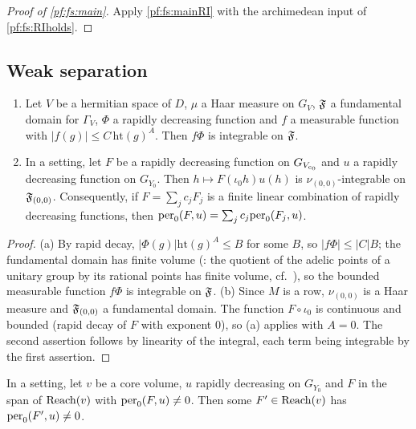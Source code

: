 \begin{proof}[Proof of \cref{pf:fs:main}]
Apply \cref{pf:fs:mainRI} with the archimedean input of \cref{pf:fs:RIholds}.
\end{proof}

\subsection{Weak separation}\label{sec:pf:fs:weak}

\begin{lemma}\label{pf:fs:perint}
\begin{enumerate}[label=(\alph*)]
\item Let $V$ be a hermitian space of $D$, $\mu$ a Haar measure on $G_V$, $\mathfrak F$ a fundamental domain for $\Gamma_V$, $\Phi$ a
rapidly decreasing function and $f$ a measurable function with $|f(g)|\le C\,\mathrm{ht}(g)^A$. Then $f\Phi$ is integrable on $\mathfrak F$.
\item In a setting, let $F$ be a rapidly decreasing function on $G_{V_{\mathrm{c}_0}}$ and $u$ a rapidly decreasing function on $G_{Y_0}$.
Then $h\mapsto F(\iota_0h)u(h)$ is $\nu_{(0,0)}$-integrable on $\mathfrak F_{(0,0)}$. Consequently, if $F=\sum_jc_jF_j$ is a finite linear
combination of rapidly decreasing functions, then $\mathrm{per}_0(F,u)=\sum_jc_j\mathrm{per}_0(F_j,u)$.
\end{enumerate}
\end{lemma}

\begin{proof}
(a) By rapid decay, $|\Phi(g)|\mathrm{ht}(g)^A\le B$ for some $B$, so $|f\Phi|\le|C|B$; the fundamental domain has finite volume
(: the quotient of the adelic points of a unitary group by its rational points has
finite volume, cf.\ \cite{Borel1969}), so the bounded measurable function $f\Phi$ is integrable on $\mathfrak F$.
(b) Since $M$ is a row, $\nu_{(0,0)}$ is a Haar measure and $\mathfrak F_{(0,0)}$ a fundamental domain. The function $F\circ\iota_0$ is
continuous and bounded (rapid decay of $F$ with exponent $0$), so (a) applies with $A=0$. The second assertion follows by
linearity of the integral, each term being integrable by the first assertion.
\end{proof}

\begin{lemma}\label{pf:fs:reachspan}
In a setting, let $v$ be a core volume, $u$ rapidly decreasing on $G_{Y_0}$ and $F$ in the span of $\mathrm{Reach}(v)$ with
$\mathrm{per}_0(F,u)\ne0$. Then some $F'\in\mathrm{Reach}(v)$ has $\mathrm{per}_0(F',u)\neq0$.
\end{lemma}

